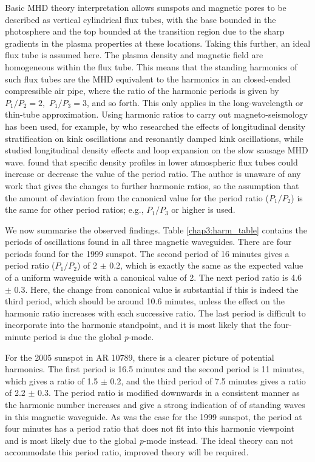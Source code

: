 	Basic MHD theory interpretation allows sunspots and magnetic pores to be described as vertical cylindrical flux tubes, with the base bounded in the photosphere and the top bounded at the transition region due to the sharp gradients in the plasma properties at these locations.
	Taking this further, an ideal flux tube is assumed here.
	The plasma density and magnetic field are homogeneous within the flux tube.
	This means that the standing harmonics of such flux tubes are the MHD equivalent to the harmonics in an closed-ended compressible air pipe, where the ratio of the harmonic periods is given by \, $P_{1}/P_{2}=2, \,\, P_{1}/P_{3}=3$, and so forth.
	This only applies in the long-wavelength or thin-tube approximation.
	Using harmonic ratios to carry out magneto-seismology has been used, for example, by \citet{2005ApJ...624L..57A,2005A&A...430.1109A} who researched the effects of longitudinal density stratification on kink oscillations and resonantly damped kink oscillations, while \citet{luna-cardozo} studied longitudinal density effects and loop expansion on the slow sausage MHD wave.
	\citet{luna-cardozo} found that specific density profiles in lower atmospheric flux tubes could increase or decrease the value of the period ratio.
	The author is unaware of any work that gives the changes to further harmonic ratios, so the assumption that the amount of deviation from the canonical value for the period ratio ($P_{1}/P_{2}$) is the same for other period ratios; e.g., $P_{1}/P_{3}$ or higher is used.
	
	We now summarise the observed findings. Table \ref{chap3:harm_table} contains the periods of oscillations found in all three magnetic waveguides.
	There are four periods found for the 1999 sunspot.
	The second period of 16 minutes gives a period ratio ($P_{1}/P_{2}$) of 2 $\pm$ 0.2, which is exactly the same as the expected value of a uniform waveguide with a canonical value of 2.
	The next period ratio is 4.6 $\pm$ 0.3.
	Here, the change from canonical value is substantial if this is indeed the third period, which should be around 10.6 minutes, unless the effect on the harmonic ratio increases with each successive ratio.
	The last period is difficult to incorporate into the harmonic standpoint, and it is most likely that the four-minute period is due the global \textit{p}-mode.
	
	For the 2005 sunspot in AR 10789, there is a clearer picture of potential harmonics.
	The first period is 16.5 minutes and the second period is 11 minutes, which gives a ratio of 1.5 $\pm$ 0.2, and the third period of 7.5 minutes gives a ratio of 2.2 $\pm$ 0.3.
	The period ratio is modified downwards in a consistent manner as the harmonic number increases and give a strong indication of of standing waves in this magnetic waveguide.
	As was the case for the 1999 sunspot, the period at four minutes has a period ratio that does not fit into this harmonic viewpoint and is most likely due to the global \textit{p}-mode instead.
	The ideal theory can not accommodate this period ratio, improved theory will be required.
	
